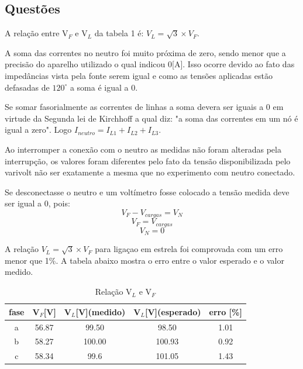 \documentclass[a4paper, 12pt]{article}
\begin{document}
    \subsection{Questões}
        \justifying
        A relação entre V\(_F\) e V\(_L\) da tabela 1 é: \(V_L = \sqrt{3}\times V_F\).
        
        A soma das correntes no neutro foi muito próxima de zero, sendo menor que a precisão do aparelho utilizado o qual indicou 0[A]. Isso ocorre devido ao fato das impedâncias vista pela fonte serem igual e como as tensões aplicadas estão defasadas de \(120^\circ\) a soma é igual a 0.
        
        Se somar fasorialmente as correntes de linhas a soma devera ser iguais a 0 em virtude da Segunda lei de Kirchhoff a qual diz: "a soma das correntes em um nó é igual a zero". Logo \(I_{neutro} = I_{L1}+I_{L2}+I_{L3}\).
         
        Ao interromper a conexão com o neutro as medidas não foram alteradas pela interrupção, os valores foram diferentes pelo fato da tensão disponibilizada pelo varivolt não ser exatamente a mesma que no experimento com neutro conectado. 

        Se desconectasse o neutro e um voltímetro fosse colocado a tensão medida deve ser igual a 0, pois: 
                \[V_F - V_{cargas} = V_N\]
                \[V_F = V_{cargas}\]
                \[V_N = 0\]
    
        A relação \(V_L = \sqrt{3}\times V_F\) para ligaçao em estrela foi comprovada com um erro menor que 1\%. A tabela abaixo mostra o erro entre o valor esperado e o valor medido.
            \begin{table}[H]
         \centering
        \begin{tabular}{|c|c|c|c|c|}
              \hline %
                  fase & V\(_F\)[V] & V\(_L \)[V](medido) & V\(_L \)[V](esperado) & erro [\%] \\
              \hline %
           a & 56.87 & 99.50 & 98.50 & 1.01     \\ 
              \hline %
           b & 58.27 & 100.00 & 100.93 & 0.92     \\ 
              \hline %
           c & 58.34 & 99.6 & 101.05 & 1.43     \\ 
              \hline %
        \end{tabular}
        \caption{Relação V\(_L\) e V\(_F\)}
    \end{table}
    
\end{document}
